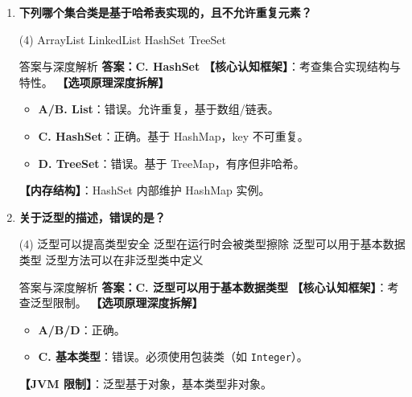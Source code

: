 ﻿\documentclass[12pt, a4paper]{ctexart}
\newcommand{\code}[1]{\texttt{#1}}
\begin{document}
\begin{enumerate}[label=\textbf{\arabic*.}, itemsep=1em]
	\item \textbf{下列哪个集合类是基于哈希表实现的，且不允许重复元素？}
	      \begin{tasks}(4)
		      \task ArrayList \task LinkedList \task HashSet \task TreeSet
	      \end{tasks}
	      \begin{bluebox}{答案与深度解析}
		      \textbf{答案：C. HashSet}
		      \textbf{【核心认知框架】}：考查集合实现结构与特性。
		      \textbf{【选项原理深度拆解】}
		      \begin{itemize}[leftmargin=*, nosep]
			      \item \textbf{A/B. List}：错误。允许重复，基于数组/链表。
			      \item \textbf{C. HashSet}：正确。基于 HashMap，key 不可重复。
			      \item \textbf{D. TreeSet}：错误。基于 TreeMap，有序但非哈希。
		      \end{itemize}
		      \textbf{【内存结构】}：HashSet 内部维护 HashMap 实例。
	      \end{bluebox}

	\item \textbf{关于泛型的描述，错误的是？}
	      \begin{tasks}(4)
		      \task 泛型可以提高类型安全
		      \task 泛型在运行时会被类型擦除
		      \task 泛型可以用于基本数据类型
		      \task 泛型方法可以在非泛型类中定义
	      \end{tasks}
	      \begin{bluebox}{答案与深度解析}
		      \textbf{答案：C. 泛型可以用于基本数据类型}
		      \textbf{【核心认知框架】}：考查泛型限制。
		      \textbf{【选项原理深度拆解】}
		      \begin{itemize}[leftmargin=*, nosep]
			      \item \textbf{A/B/D}：正确。
			      \item \textbf{C. 基本类型}：错误。必须使用包装类（如 \code{Integer}）。
		      \end{itemize}
		      \textbf{【JVM 限制】}：泛型基于对象，基本类型非对象。
	      \end{bluebox}


\end{enumerate}
\end{document}
